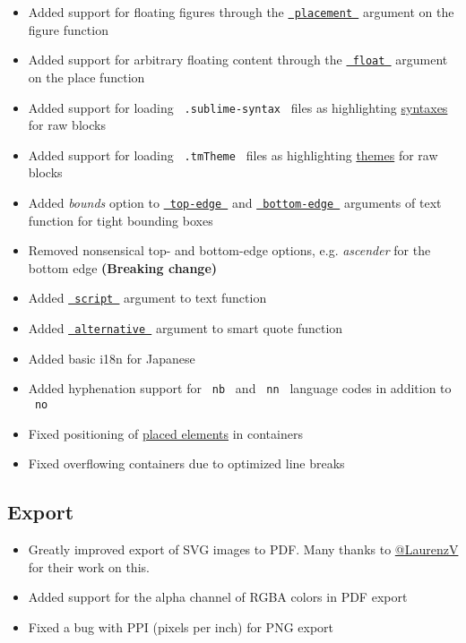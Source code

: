 \begin{itemize}
\tightlist
\item
  Added support for floating figures through the
  \href{/docs/reference/model/figure/\#parameters-placement}{\texttt{\ placement\ }}
  argument on the figure function
\item
  Added support for arbitrary floating content through the
  \href{/docs/reference/layout/place/\#parameters-float}{\texttt{\ float\ }}
  argument on the place function
\item
  Added support for loading \texttt{\ .sublime-syntax\ } files as
  highlighting
  \href{/docs/reference/text/raw/\#parameters-syntaxes}{syntaxes} for
  raw blocks
\item
  Added support for loading \texttt{\ .tmTheme\ } files as highlighting
  \href{/docs/reference/text/raw/\#parameters-theme}{themes} for raw
  blocks
\item
  Added \emph{bounds} option to
  \href{/docs/reference/text/text/\#parameters-top-edge}{\texttt{\ top-edge\ }}
  and
  \href{/docs/reference/text/text/\#parameters-bottom-edge}{\texttt{\ bottom-edge\ }}
  arguments of text function for tight bounding boxes
\item
  Removed nonsensical top- and bottom-edge options, e.g. \emph{ascender}
  for the bottom edge \textbf{(Breaking change)}
\item
  Added
  \href{/docs/reference/text/text/\#parameters-script}{\texttt{\ script\ }}
  argument to text function
\item
  Added
  \href{/docs/reference/text/smartquote/\#parameters-alternative}{\texttt{\ alternative\ }}
  argument to smart quote function
\item
  Added basic i18n for Japanese
\item
  Added hyphenation support for \texttt{\ nb\ } and \texttt{\ nn\ }
  language codes in addition to \texttt{\ no\ }
\item
  Fixed positioning of \href{/docs/reference/layout/place/}{placed
  elements} in containers
\item
  Fixed overflowing containers due to optimized line breaks
\end{itemize}

\subsection{Export}\label{export}

\begin{itemize}
\tightlist
\item
  Greatly improved export of SVG images to PDF. Many thanks to
  \href{https://github.com/LaurenzV}{@LaurenzV} for their work on this.
\item
  Added support for the alpha channel of RGBA colors in PDF export
\item
  Fixed a bug with PPI (pixels per inch) for PNG export
\end{itemize}

